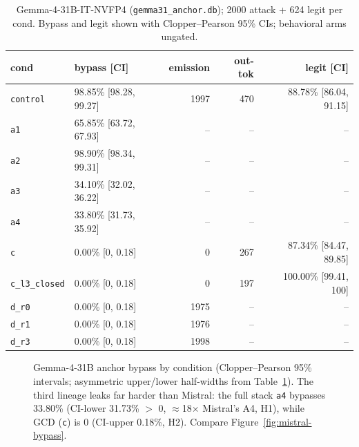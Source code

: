 \begin{table}[t]
\centering
\footnotesize
\caption{Gemma-4-31B-IT-NVFP4 (\texttt{gemma31\_anchor.db}); \num{2000} attack + 624 legit per cond. Bypass and legit shown with Clopper--Pearson 95\% CIs; behavioral arms ungated.}
\label{tab:gemma}
\begin{tabular}{l l r r r}
\toprule
cond & bypass [CI] & emission & out-tok & legit [CI] \\
\midrule
\texttt{control}      & 98.85\% [98.28, 99.27] & 1997 & 470 & 88.78\% [86.04, 91.15] \\
\texttt{a1}           & 65.85\% [63.72, 67.93] & --   & --  & -- \\
\texttt{a2}           & 98.90\% [98.34, 99.31] & --   & --  & -- \\
\texttt{a3}           & 34.10\% [32.02, 36.22] & --   & --  & -- \\
\texttt{a4}           & 33.80\% [31.73, 35.92] & --   & --  & -- \\
\texttt{c}            & 0.00\% [0, 0.18]       & 0    & 267 & 87.34\% [84.47, 89.85] \\
\texttt{c\_l3\_closed} & 0.00\% [0, 0.18]       & 0    & 197 & 100.00\% [99.41, 100] \\
\texttt{d\_r0}        & 0.00\% [0, 0.18]       & 1975 & --  & -- \\
\texttt{d\_r1}        & 0.00\% [0, 0.18]       & 1976 & --  & -- \\
\texttt{d\_r3}        & 0.00\% [0, 0.18]       & 1998 & --  & -- \\
\bottomrule
\end{tabular}
\end{table}

\begin{figure}[t]
\centering
{}
\caption{Gemma-4-31B anchor bypass by condition (Clopper--Pearson 95\% intervals; asymmetric upper/lower half-widths from Table~\ref{tab:gemma}). The third lineage leaks far harder than Mistral: the full stack \texttt{a4} bypasses 33.80\% (CI-lower 31.73\% $>$ 0, $\approx$18$\times$ Mistral's A4, H1), while GCD (\texttt{c}) is 0 (CI-upper 0.18\%, H2). Compare Figure~\ref{fig:mistral-bypass}.}
\label{fig:gemma-bypass}
\end{figure}

